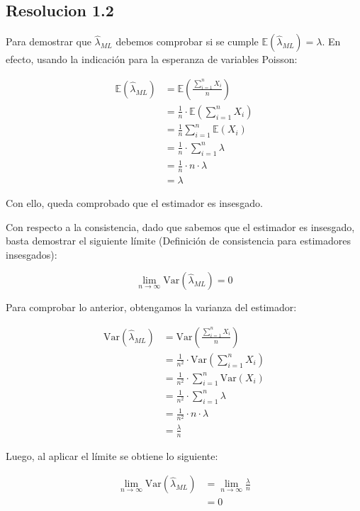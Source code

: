 \documentclass[
  11pt,
  letterpaper,
   addpoints,
  ]{exam}
\begin{document}
\begin{questions}
\begin{solution}
\subsection*{Resolucion 1.2}
Para demostrar que $\hat{\lambda}_{ML}$ debemos comprobar si se cumple $\mathbb{E}(\hat{\lambda}_{ML}) = \lambda$. En efecto, usando la indicación para la esperanza de variables Poisson:

\begin{align}
\mathbb{E}(\hat{\lambda}_{ML}) &= \mathbb{E}\left(\frac{\sum_{i=1}^n X_i}{n}\right) \\
&= \frac{1}{n} \cdot \mathbb{E}\left(\sum_{i=1}^n X_i\right) \\
&= \frac{1}{n} \sum_{i=1}^n \mathbb{E}(X_i) \\
&= \frac{1}{n} \cdot \sum_{i=1}^n \lambda \\
&= \frac{1}{n} \cdot n \cdot \lambda \\
&= \lambda
\end{align}

Con ello, queda comprobado que el estimador es insesgado.

Con respecto a la consistencia, dado que sabemos que el estimador es insesgado, basta demostrar el siguiente límite (Definición de consistencia para estimadores insesgados):

\[
\lim_{n \to \infty} \mathrm{Var}(\hat{\lambda}_{ML}) = 0
\]

Para comprobar lo anterior, obtengamos la varianza del estimador:

\begin{align}
\mathrm{Var}(\hat{\lambda}_{ML}) &= \mathrm{Var}\left(\frac{\sum_{i=1}^n X_i}{n}\right) \\
&= \frac{1}{n^2} \cdot \mathrm{Var}\left(\sum_{i=1}^n X_i\right) \\
&= \frac{1}{n^2} \cdot \sum_{i=1}^n \mathrm{Var}(X_i) \\
&= \frac{1}{n^2} \cdot \sum_{i=1}^n \lambda \\
&= \frac{1}{n^2} \cdot n \cdot \lambda \\
&= \frac{\lambda}{n}
\end{align}

Luego, al aplicar el límite se obtiene lo siguiente:

\begin{align}
\lim_{n \to \infty} \mathrm{Var}(\hat{\lambda}_{ML}) &= \lim_{n \to \infty} \frac{\lambda}{n} \\
&= 0
\end{align}


\end{solution}
\end{questions}
\end{document}
